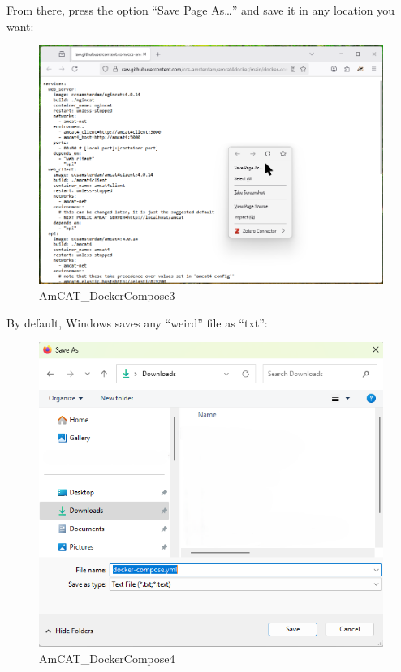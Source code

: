 \documentclass[
  letterpaper,
  DIV=11,
  numbers=noendperiod]{scrreprt}
\begin{document}
From there, press the option ``Save Page As\ldots{}'' and save it in any
location you want:

\begin{figure}[H]

{\centering \includegraphics[width=6.25in,height=\textheight]{media/amcat-2.1.2_4.png}

}

\caption{AmCAT\_DockerCompose3}

\end{figure}%

By default, Windows saves any ``weird'' file as ``txt'':

\begin{figure}[H]

{\centering \includegraphics[width=6.25in,height=\textheight]{media/amcat-2.1.2_5.png}

}

\caption{AmCAT\_DockerCompose4}

\end{figure}%
\end{document}
